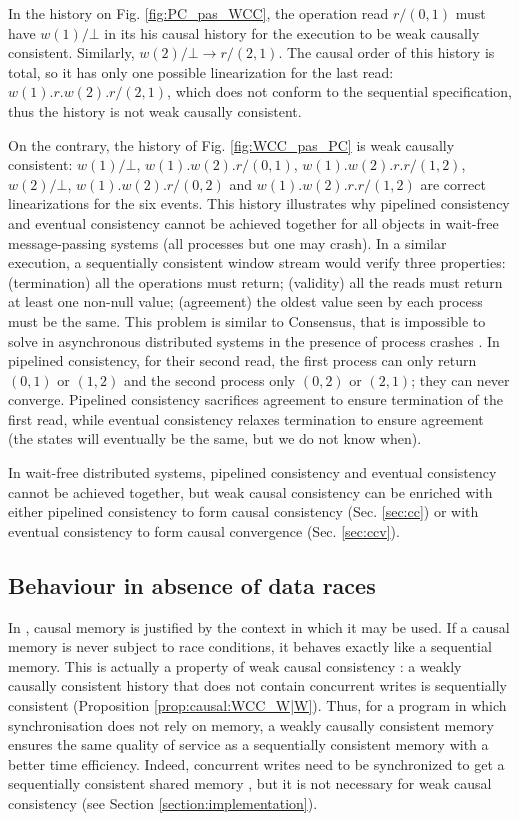 \documentclass[9pt,numbers]{sigplanconf}
\begin{document}
In the history on Fig. \ref{fig:PC_pas_WCC}, the operation read $r/(0,1)$ must have $w(1)/\bot$
in its his causal history for the execution to be weak causally consistent. Similarly,
$w(2)/\bot\rightarrow r/(2,1)$. The causal order of this history is total, so it
has only one possible linearization for the last read: $w(1).r.w(2).r/(2,1)$, which does not
conform to the sequential specification, thus the history is not weak causally consistent.
\newpage

On the contrary, the history of Fig. \ref{fig:WCC_pas_PC} is weak causally consistent:
$w(1)/\bot$, $w(1).w(2).r/(0,1)$, $w(1).w(2).r.r/(1,2)$, $w(2)/\bot$, $w(1).w(2).r/(0,2)$
and $w(1).w(2).r.r/(1,2)$ are correct linearizations for the six events. 
This history illustrates why pipelined consistency and eventual consistency cannot be achieved
together for all objects in wait-free message-passing systems \cite{perrin2015update} (all processes but one may crash). 
In a similar execution, a sequentially consistent window stream would verify three properties: 
(termination) all the operations must return; (validity) all the reads must return at least one non-null value; 
(agreement) the oldest value seen by each process must be the same. This problem is similar to
Consensus, that is impossible to solve in asynchronous distributed systems in the presence of process crashes \cite{fischer1985impossibility}. 
In pipelined consistency, for their second read, the first process can only return $(0,1)$ or $(1,2)$ and the second
process only $(0,2)$ or $(2,1)$; they can never converge. Pipelined consistency
sacrifices agreement to ensure termination of the first read, while eventual consistency relaxes termination 
to ensure agreement (the states will eventually be the same, but we do not know when). 

In wait-free distributed systems, pipelined consistency and eventual consistency cannot be achieved together, 
but weak causal consistency can be enriched with either pipelined consistency to form causal consistency (Sec. \ref{sec:cc})
or with eventual consistency to form causal convergence (Sec. \ref{sec:ccv}).

\subsection{Behaviour in absence of data races}

In \cite{ahamad1995causal}, causal memory is justified by the context in which it may be used. 
If a causal memory is never subject to race conditions, it behaves exactly like a sequential memory.
This is actually a property of weak causal consistency : a weakly causally consistent history 
that does not contain concurrent writes is sequentially consistent (Proposition \ref{prop:causal:WCC_W|W}).
Thus, for a program in which synchronisation does not rely on memory, a weakly causally consistent memory
ensures the same quality of service as a sequentially consistent memory with a better time efficiency.
Indeed, concurrent writes need to be synchronized to get a sequentially consistent shared memory \cite{attiya1994sequential},
but it is not necessary for weak causal consistency (see Section \ref{section:implementation}).
\end{document}

